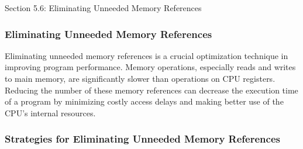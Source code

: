 \begin{notes}{Section 5.6: Eliminating Unneeded Memory References}
    \subsubsection*{Eliminating Unneeded Memory References}

    Eliminating unneeded memory references is a crucial optimization technique in improving program performance. Memory operations, especially reads and writes to main memory, are significantly slower 
    than operations on CPU registers. Reducing the number of these memory references can decrease the execution time of a program by minimizing costly access delays and making better use of the CPU's 
    internal resources.
    
    \subsubsection*{Strategies for Eliminating Unneeded Memory References}
    

\end{notes}

